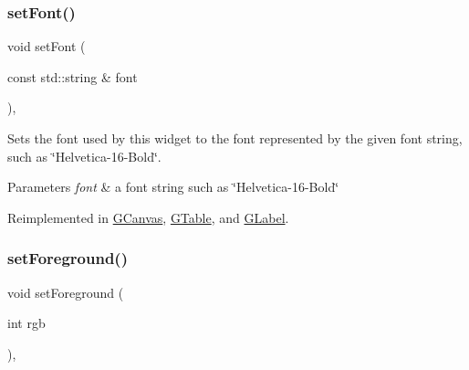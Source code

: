 \mbox{\label{classGInteractor_a8e096e8818d838aceae1d46d58fb3a7b}} 
\subsubsection{\texorpdfstring{set\+Font()}{setFont()}\hspace{0.1cm}{\footnotesize\ttfamily [2/2]}}
{\footnotesize\ttfamily void set\+Font (\begin{DoxyParamCaption}\item[{const std\+::string \&}]{font }\end{DoxyParamCaption})\hspace{0.3cm}{\ttfamily [virtual]}, {\ttfamily [inherited]}}



Sets the font used by this widget to the font represented by the given font string, such as \char`\"{}\+Helvetica-\/16-\/\+Bold\char`\"{}. 


\begin{DoxyParams}{Parameters}
{\em font} & a font string such as \char`\"{}\+Helvetica-\/16-\/\+Bold\char`\"{} \\
\hline
\end{DoxyParams}


Reimplemented in \mbox{\hyperlink{classGCanvas_ab39ef411fb13a52852ddd138c5932e2e}{G\+Canvas}}, \mbox{\hyperlink{classGTable_ab39ef411fb13a52852ddd138c5932e2e}{G\+Table}}, and \mbox{\hyperlink{classGLabel_ab39ef411fb13a52852ddd138c5932e2e}{G\+Label}}.

\mbox{\label{classGInteractor_a9eb856b5ff83a19df3831a31f15f4563}} 
\subsubsection{\texorpdfstring{set\+Foreground()}{setForeground()}\hspace{0.1cm}{\footnotesize\ttfamily [1/2]}}
{\footnotesize\ttfamily void set\+Foreground (\begin{DoxyParamCaption}\item[{int}]{rgb }\end{DoxyParamCaption})\hspace{0.3cm}{\ttfamily [virtual]}, {\ttfamily [inherited]}}



